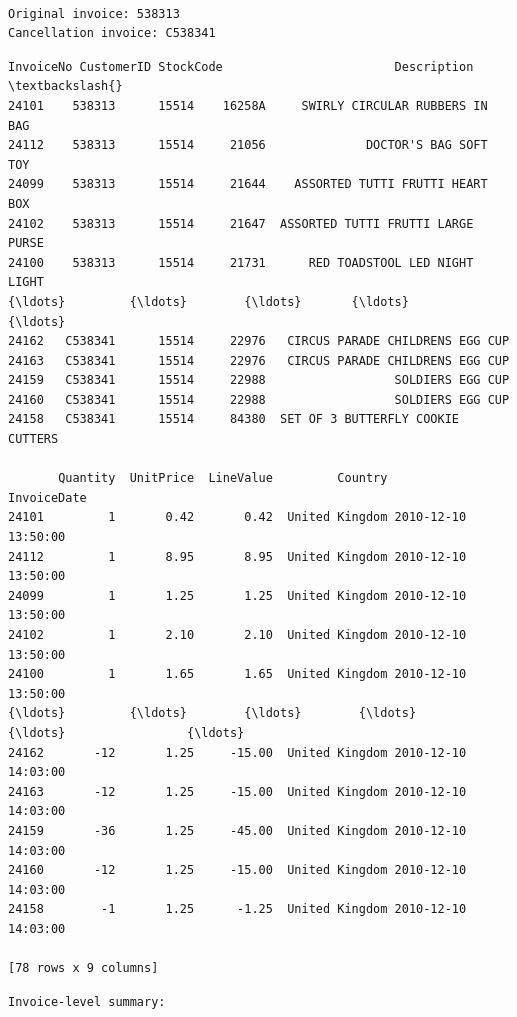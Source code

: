 \documentclass[11pt]{article}
\begin{document}
    \begin{Verbatim}[commandchars=\\\{\}]

Original invoice: 538313
Cancellation invoice: C538341
    \end{Verbatim}

    
    \begin{Verbatim}[commandchars=\\\{\}]
      InvoiceNo CustomerID StockCode                        Description  \textbackslash{}
24101    538313      15514    16258A     SWIRLY CIRCULAR RUBBERS IN BAG   
24112    538313      15514     21056              DOCTOR'S BAG SOFT TOY   
24099    538313      15514     21644    ASSORTED TUTTI FRUTTI HEART BOX   
24102    538313      15514     21647  ASSORTED TUTTI FRUTTI LARGE PURSE   
24100    538313      15514     21731      RED TOADSTOOL LED NIGHT LIGHT   
{\ldots}         {\ldots}        {\ldots}       {\ldots}                                {\ldots}   
24162   C538341      15514     22976   CIRCUS PARADE CHILDRENS EGG CUP    
24163   C538341      15514     22976   CIRCUS PARADE CHILDRENS EGG CUP    
24159   C538341      15514     22988                  SOLDIERS EGG CUP    
24160   C538341      15514     22988                  SOLDIERS EGG CUP    
24158   C538341      15514     84380  SET OF 3 BUTTERFLY COOKIE CUTTERS   

       Quantity  UnitPrice  LineValue         Country         InvoiceDate  
24101         1       0.42       0.42  United Kingdom 2010-12-10 13:50:00  
24112         1       8.95       8.95  United Kingdom 2010-12-10 13:50:00  
24099         1       1.25       1.25  United Kingdom 2010-12-10 13:50:00  
24102         1       2.10       2.10  United Kingdom 2010-12-10 13:50:00  
24100         1       1.65       1.65  United Kingdom 2010-12-10 13:50:00  
{\ldots}         {\ldots}        {\ldots}        {\ldots}             {\ldots}                 {\ldots}  
24162       -12       1.25     -15.00  United Kingdom 2010-12-10 14:03:00  
24163       -12       1.25     -15.00  United Kingdom 2010-12-10 14:03:00  
24159       -36       1.25     -45.00  United Kingdom 2010-12-10 14:03:00  
24160       -12       1.25     -15.00  United Kingdom 2010-12-10 14:03:00  
24158        -1       1.25      -1.25  United Kingdom 2010-12-10 14:03:00  

[78 rows x 9 columns]
    \end{Verbatim}

    
    \begin{Verbatim}[commandchars=\\\{\}]
Invoice-level summary:
    \end{Verbatim}
\end{document}
